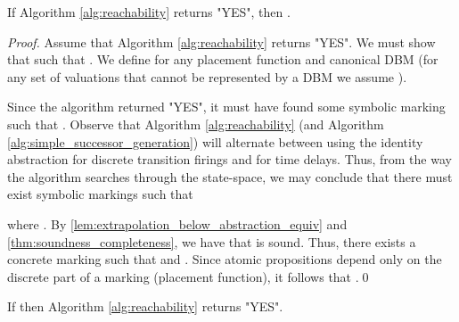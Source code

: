 \begin{lemma}\label{lem:algorithm_yes_implies_initial_marking_satisfies_property}
If Algorithm \ref{alg:reachability} returns "YES", then .
\end{lemma}
\begin{proof}
Assume that Algorithm \ref{alg:reachability} returns "YES". We must show that  such that . We define  for any placement function  and canonical DBM  (for any set of valuations  that cannot be represented by a DBM we assume ).

Since the algorithm returned "YES", it must have found some symbolic marking  such that . Observe that Algorithm \ref{alg:reachability} (and Algorithm \ref{alg:simple_successor_generation}) will alternate between using the identity abstraction for discrete transition firings and  for time delays. Thus, from the way the algorithm searches through the state-space, we may conclude that there must exist symbolic markings  such that

where . By \cref{lem:extrapolation_below_abstraction_equiv} and \cref{thm:soundness_completeness}, we have that  is sound. Thus, there exists a concrete marking  such that  and . Since atomic propositions depend only on the discrete part of a marking (placement function), it follows that .\qed
\end{proof}

\begin{lemma}\label{lem:init_marking_satisfies_property_implies_algorithm_yes}
If  then 
Algorithm \ref{alg:reachability} returns "YES".
\end{lemma}

